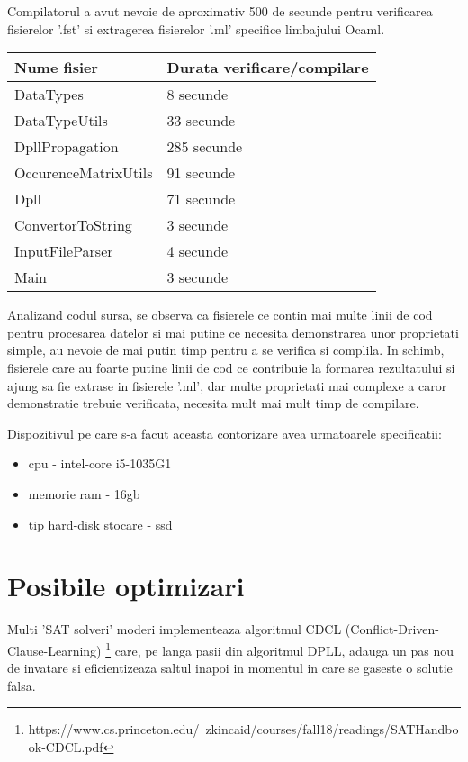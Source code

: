 Compilatorul a avut nevoie de aproximativ 500 de secunde pentru verificarea fisierelor '.fst' si extragerea fisierelor '.ml' specifice limbajului Ocaml. 
\newline

\begin{tabular}{|l|l|} \hline
	Nume fisier & Durata verificare/compilare \\\hline
	DataTypes & 8 secunde \\\hline
	DataTypeUtils & 33 secunde \\\hline
	DpllPropagation & 285 secunde \\\hline
	OccurenceMatrixUtils & 91 secunde \\\hline
	Dpll & 71 secunde \\\hline
	ConvertorToString & 3 secunde \\\hline
	InputFileParser & 4 secunde \\\hline
	Main & 3 secunde \\\hline	
\end{tabular}
\newline\newline

Analizand codul sursa, se observa ca fisierele ce contin mai multe linii de cod pentru procesarea datelor si mai putine ce necesita demonstrarea unor proprietati simple, au nevoie de mai putin timp pentru a se verifica si complila. In schimb, fisierele care au foarte putine linii de cod ce contribuie la formarea rezultatului si ajung sa fie extrase in fisierele '.ml', dar multe proprietati mai complexe a caror demonstratie trebuie verificata, necesita mult mai mult timp de compilare.
\newline

Dispozitivul pe care s-a facut aceasta contorizare avea urmatoarele specificatii:
\begin{itemize}
	\item cpu - intel-core i5-1035G1
	\item memorie ram - 16gb
	\item tip hard-disk stocare - ssd
\end{itemize}



\section{Posibile optimizari}

Multi 'SAT solveri' moderi implementeaza algoritmul CDCL (Conflict-Driven-Clause-Learning) \footnote{https://www.cs.princeton.edu/~zkincaid/courses/fall18/readings/SATHandbook-CDCL.pdf}
 care, pe langa pasii din algoritmul DPLL, adauga un pas nou de invatare si eficientizeaza saltul inapoi in momentul in care se gaseste o solutie falsa.

